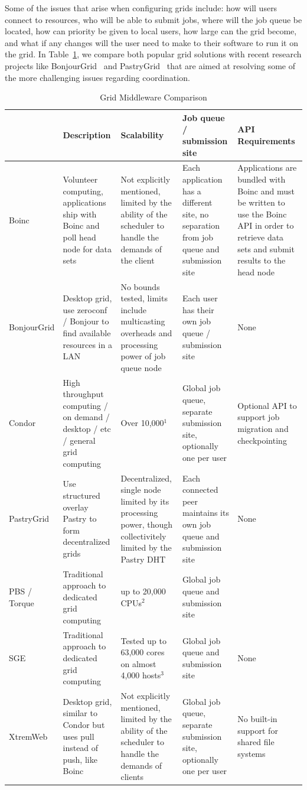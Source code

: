 \documentclass[conference]{IEEEtran}
\begin{document}
Some of the issues that arise when configuring grids include:  how will users
connect to resources, who will be able to submit jobs, where will the job queue
be located, how can priority be given to local users, how large can the grid
become, and what if any changes will the user need to make to their software to
run it on the grid.  In Table~\ref{tab:grid}, we compare both popular grid
solutions with recent research projects like BonjourGrid~\cite{bonjourgrid} and
PastryGrid~\cite{pastrygrid} that are aimed at resolving some of the more
challenging issues regarding coordination.

\begin{table}[ht]
\small{
\centering
\begin{tabular}[c]{|p{1.4cm}||p{3.475cm}|p{3.475cm}|p{3.475cm}|p{3.475cm}|} \hline
& Description & Scalability & Job queue / submission site & API Requirements \\ \hline \hline
Boinc &
Volunteer computing, applications ship with Boinc and poll head node for data
sets &
Not explicitly mentioned, limited by the ability of the scheduler to handle
the demands of the client &
Each application has a different site, no separation from job queue and
submission site &
Applications are bundled with Boinc and must be written to use the Boinc API
in order to retrieve data sets and submit results to the head node
\\ \hline
BonjourGrid &
Desktop grid, use zeroconf / Bonjour to find available resources in a LAN &
No bounds tested, limits include multicasting overheads and processing power
of job queue node &
Each user has their own job queue / submission site &
None \\ \hline
Condor &
High throughput computing / on demand / desktop / etc / general grid computing &
Over 10,000$^{1}$ &
Global job queue, separate submission site, optionally one per user &
Optional API to support job migration and checkpointing \\ \hline
PastryGrid &
Use structured overlay Pastry to form decentralized grids &
Decentralized, single node limited by its processing power, though
collectivitely limited by the Pastry DHT &
Each connected peer maintains its own job queue and submission site &
None \\ \hline
PBS / Torque~\cite{torque} &
Traditional approach to dedicated grid computing &
up to 20,000 CPUs$^{2}$ &
Global job queue and submission site &
\\ \hline
SGE &
Traditional approach to dedicated grid computing &
Tested up to 63,000 cores on almost 4,000 hosts$^{3}$ &
Global job queue and submission site &
None
\\ \hline
XtremWeb &
Desktop grid, similar to Condor but uses pull instead of push, like Boinc &
Not explicitly mentioned, limited by the ability of the scheduler to handle
the demands of clients &
Global job queue, separate submission site, optionally one per user &
No built-in support for shared file systems
\\ \hline
\end{tabular}
\caption{Grid Middleware Comparison}
\label{tab:grid}
}
\end{table}
\end{document}
